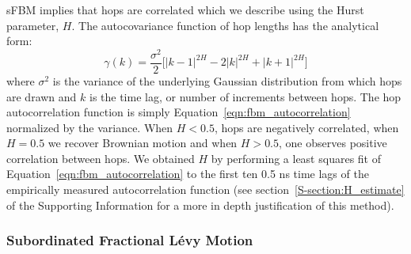 \documentclass[journal=ancac3,manuscript=article,layout=twocolumn]{achemso}
\begin{document}
  sFBM implies that hops are correlated which we describe using the Hurst
  parameter, $H$. The autocovariance function of hop lengths has the
  analytical form:~\cite{mandelbrot_fractional_1968}
  \begin{equation}
    \gamma(k) = \dfrac{\sigma^2}{2}\bigg[|k-1|^{2H} - 2|k|^{2H} + |k+1|^{2H}\bigg]
  \label{eqn:fbm_autocorrelation}
  \end{equation}
  where $\sigma^2$ is the variance of the underlying Gaussian distribution from
  which hops are drawn and $k$ is the time lag, or number of increments between
  hops. The hop autocorrelation function is simply
  Equation~\ref{eqn:fbm_autocorrelation} normalized by the variance.  When $H <
  0.5$, hops are negatively correlated, when $H = 0.5$ we recover Brownian
  motion and when $H > 0.5$, one observes positive correlation between hops. 
  We obtained $H$ by performing a least squares fit of 
  Equation~\ref{eqn:fbm_autocorrelation} to the first ten 0.5 ns time lags of 
  the empirically measured autocorrelation function (see section~\ref{S-section:H_estimate}
  of the Supporting Information for a more in depth justification of this method).
 

  \subsubsection{Subordinated Fractional L\'evy Motion}\label{method:sflm}
\end{document}
